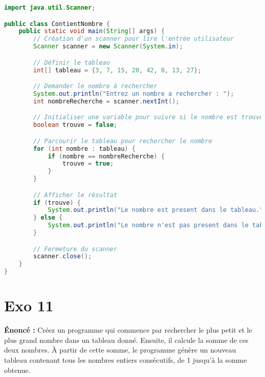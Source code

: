 \documentclass{article}
\begin{document}
\begin{lstlisting}[language=Java]
import java.util.Scanner;

public class ContientNombre {
    public static void main(String[] args) {
        // Création d'un scanner pour lire l'entrée utilisateur
        Scanner scanner = new Scanner(System.in);

        // Définir le tableau
        int[] tableau = {3, 7, 15, 20, 42, 8, 13, 27};

        // Demander le nombre à rechercher
        System.out.println("Entrez un nombre a rechercher : ");
        int nombreRecherche = scanner.nextInt();

        // Initialiser une variable pour suivre si le nombre est trouvé
        boolean trouve = false;

        // Parcourir le tableau pour rechercher le nombre
        for (int nombre : tableau) {
            if (nombre == nombreRecherche) {
                trouve = true;
            }
        }

        // Afficher le résultat
        if (trouve) {
            System.out.println("Le nombre est present dans le tableau.");
        } else {
            System.out.println("Le nombre n'est pas present dans le tableau.");
        }

        // Fermeture du scanner
        scanner.close();
    }
}
\end{lstlisting}
\clearpage

\section*{Exo 11}
\noindent \textbf{Énoncé :} Créez un programme qui commence par rechercher le plus petit et le plus grand nombre dans un tableau donné. Ensuite, il calcule la somme de ces deux nombres. \`A partir de cette somme, le programme génère un nouveau tableau contenant tous les nombres entiers consécutifs, de 1 jusqu’\`a la somme obtenue.
\end{document}
